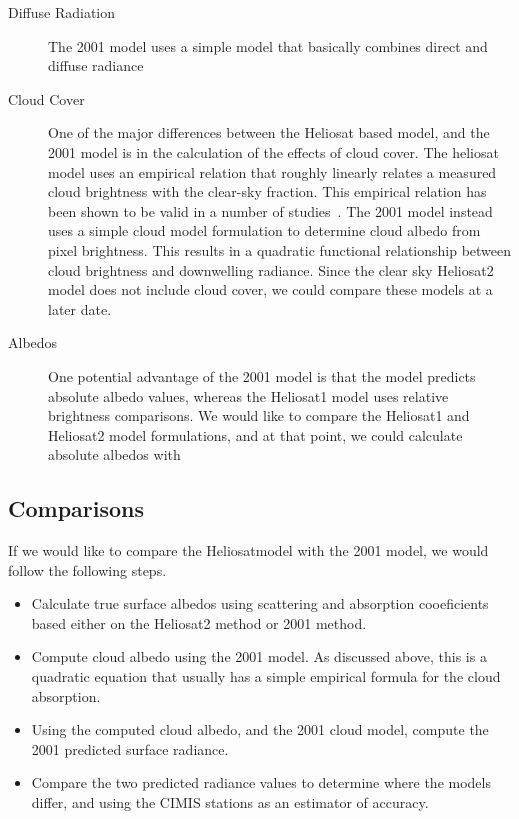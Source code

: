 \documentclass[letterpaper]{article}
\newcommand{\hel}{Heliosat}
\begin{document}
\begin{description}
\item[Diffuse Radiation]
  
  The 2001 model uses a simple model that basically combines direct
  and diffuse radiance


\item[Cloud Cover] 
  
  One of the major differences between the Heliosat based model, and
  the 2001 model is in the calculation of the effects of cloud cover.
  The heliosat model uses an empirical relation that roughly linearly
  relates a measured cloud brightness with the clear-sky fraction.
  This empirical relation has been shown to be valid in a number of
  studies~\cite{beyer.ea:96:modif-of}. The 2001 model instead uses a
  simple cloud model formulation to determine cloud albedo from pixel
  brightness.  This results in a quadratic functional relationship
  between cloud brightness and downwelling radiance.  Since the clear
  sky \hel2 model does not include cloud cover, we could compare these
  models at a later date.


\item[Albedos] 
  
  One potential advantage of the 2001 model is that the model predicts
  absolute albedo values, whereas the \hel1 model uses relative
  brightness comparisons.  We would like to compare the \hel1 and
  \hel2 model formulations, and at that point, we could calculate
  absolute albedos with

\end{description}

\subsection{Comparisons}

If we would like to compare the \hel model with the 2001 model, we
would follow the following steps.  

\begin{itemize}
  
\item Calculate true surface albedos using scattering and absorption
  cooeficients based either on the \hel2 method or 2001 method. 
  
\item Compute cloud albedo using the 2001 model.  As discussed above,
  this is a quadratic equation that usually has a simple empirical
  formula for the cloud absorption.
  
\item Using the computed cloud albedo, and the 2001 cloud model,
  compute the 2001 predicted surface radiance.  
  
\item Compare the two predicted radiance values to determine where the
  models differ, and using the CIMIS stations as an estimator of
  accuracy.

\end{itemize}




\end{document}
